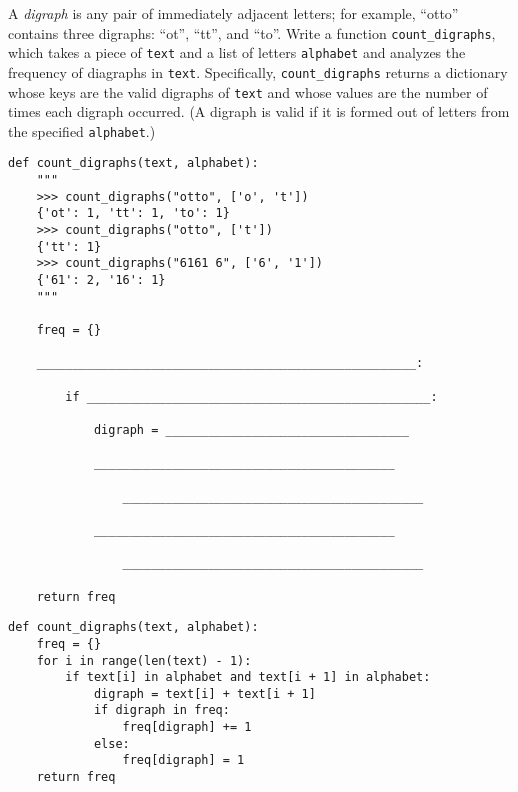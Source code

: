 \begin{blocksection}
\question A \textit{digraph} is any pair of immediately adjacent letters; for example, ``otto'' contains three digraphs: ``ot'', ``tt'', and ``to''. Write a function \lstinline{count_digraphs}, which takes a piece of \lstinline{text} and a list of letters \lstinline{alphabet} and analyzes the frequency of diagraphs in \lstinline{text}. Specifically, \lstinline{count_digraphs} returns a dictionary whose keys are the valid digraphs of \lstinline{text} and whose values are the number of times each digraph occurred. (A digraph is valid if it is formed out of letters from the specified \lstinline{alphabet}.)

\begin{lstlisting}
def count_digraphs(text, alphabet):
    """
    >>> count_digraphs("otto", ['o', 't'])
    {'ot': 1, 'tt': 1, 'to': 1}
    >>> count_digraphs("otto", ['t'])
    {'tt': 1}
    >>> count_digraphs("6161 6", ['6', '1'])
    {'61': 2, '16': 1}
    """

    freq = {}

    _____________________________________________________:

        if ________________________________________________:

            digraph = __________________________________

            __________________________________________

                __________________________________________

            __________________________________________

                __________________________________________

    return freq
\end{lstlisting}
\end{blocksection}
\newpage
\begin{solution}
\begin{lstlisting}
def count_digraphs(text, alphabet):
    freq = {}
    for i in range(len(text) - 1):
        if text[i] in alphabet and text[i + 1] in alphabet:
            digraph = text[i] + text[i + 1]
            if digraph in freq:
                freq[digraph] += 1
            else: 
                freq[digraph] = 1
    return freq
\end{lstlisting}
\end{solution}


